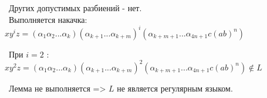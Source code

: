 \documentclass{article}
\begin{document}
\begin{enumerate}
\ Других допустимых разбиений - нет. \\ 

\ Выполняется накачка: \\

$xy^{i}z = (\alpha_1\alpha_2...\alpha_k)(\alpha_{k+1}...\alpha_{k+m})^i(\alpha_{k+m+1}...\alpha_{4n+1}c(ab)^n)$

\ При \(i = 2\) : \\

$xy^{2}z = (\alpha_1\alpha_2...\alpha_k)(\alpha_{k+1}...\alpha_{k+m})^2(\alpha_{k+m+1}...\alpha_{4n+1}c(ab)^n) \notin L$

\ Лемма не выполняется => \(L\) не является регулярным языком. \\

\end {enumerate}
\end{document}
